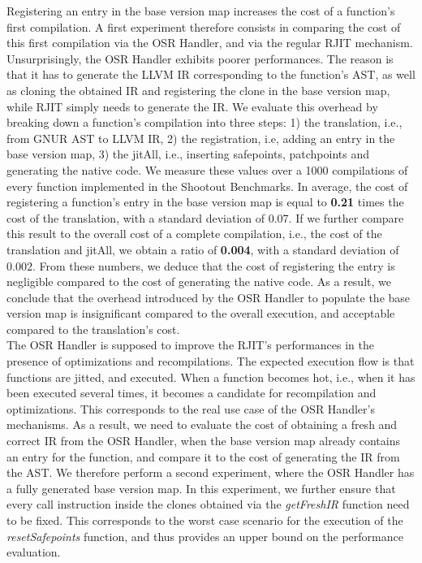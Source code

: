 Registering an entry in the base version map increases the cost of a function's first compilation.
A first experiment therefore consists in comparing the cost of this first compilation via the OSR Handler, and via the regular RJIT mechanism. 
Unsurprisingly, the OSR Handler exhibits poorer performances. 
The reason is that it has to generate the LLVM IR corresponding to the function's AST, as well as cloning the obtained IR and registering the clone in the base version map, while RJIT simply needs to generate the IR.
We evaluate this overhead by breaking down a function's compilation into three steps: 1) the translation, i.e., from GNUR AST to LLVM IR, 2) the registration, i.e, adding an entry in the base version map, 3) the jitAll, i.e., inserting safepoints, patchpoints and generating the native code.
We measure these values over a 1000 compilations of every function implemented in the Shootout Benchmarks.
In average, the cost of registering a function's entry in the base version map is equal to \textbf{0.21} times the cost of the translation, with a standard deviation of 0.07.
If we further compare this result to the overall cost of a complete compilation, i.e., the cost of the translation and jitAll, we obtain a ratio of \textbf{0.004}, with a standard deviation of 0.002. 
From these numbers, we deduce that the cost of registering the entry is negligible compared to the cost of generating the native code.   
As a result, we conclude that the overhead introduced by the OSR Handler to populate the base version map is insignificant compared to the overall execution, and acceptable compared to the translation's cost.\\


The OSR Handler is supposed to improve the RJIT's performances in the presence of optimizations and recompilations.
The expected execution flow is that functions are jitted, and executed. 
When a function becomes hot, i.e., when it has been executed several times, it becomes a candidate for recompilation and optimizations.
This corresponds to the real use case of the OSR Handler's mechanisms.
As a result, we need to evaluate the cost of obtaining a fresh and correct IR from the OSR Handler, when the base version map already contains an entry for the function, and compare it to the cost of generating the IR from the AST.
We therefore perform a second experiment, where the OSR Handler has a fully generated base version map.
In this experiment, we further ensure that every call instruction inside the clones obtained via the \textit{getFreshIR} function need to be fixed.
This corresponds to the worst case scenario for the execution of the \textit{resetSafepoints} function, and thus provides an upper bound on the performance evaluation.\\

